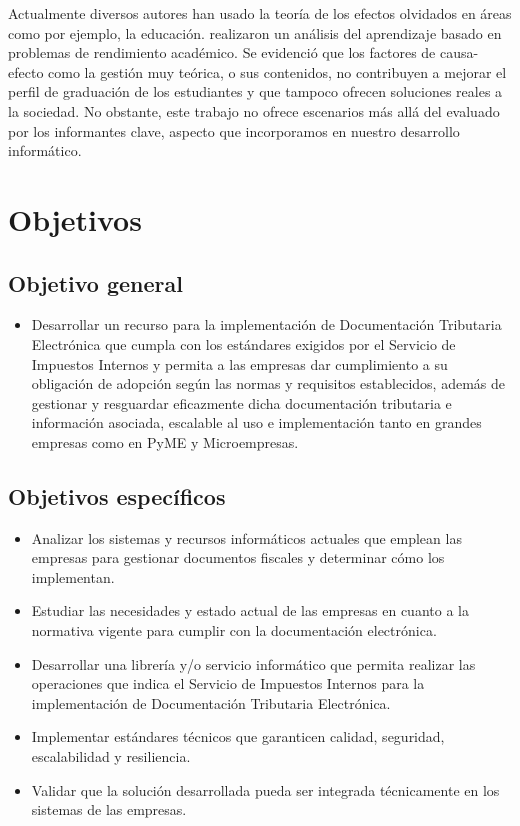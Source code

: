 Actualmente diversos autores han usado la teoría de los efectos olvidados en áreas como por ejemplo, la educación. \textcite{cabrera2020analysis} realizaron un análisis del aprendizaje basado en problemas de rendimiento académico. Se evidenció que los factores de causa-efecto como la gestión muy teórica, o sus contenidos, no contribuyen a mejorar el perfil de graduación de los estudiantes y que tampoco ofrecen soluciones reales a la sociedad. No obstante, este trabajo no ofrece escenarios más allá del evaluado por los informantes clave, aspecto que incorporamos en nuestro desarrollo informático.  \\

\section{Objetivos}
\subsection{Objetivo general}
\begin{itemize} 
    \item Desarrollar un recurso para la implementación de Documentación Tributaria Electrónica que cumpla con los estándares exigidos por el Servicio de Impuestos Internos y permita a las empresas dar cumplimiento a su obligación de adopción según las normas y requisitos establecidos, además de gestionar y resguardar eficazmente dicha documentación tributaria e información asociada, escalable al uso e implementación tanto en grandes empresas como en PyME y Microempresas.
\end{itemize}
\subsection{Objetivos específicos}
\begin{itemize}
	\item Analizar los sistemas y recursos informáticos actuales que emplean las empresas para gestionar documentos fiscales y determinar cómo los implementan.
	\item Estudiar las necesidades y estado actual de las empresas en cuanto a la normativa vigente para cumplir con la documentación electrónica.
	\item Desarrollar una librería y/o servicio informático que permita realizar las operaciones que indica el Servicio de Impuestos Internos para la implementación de Documentación Tributaria Electrónica.
	\item Implementar estándares técnicos que garanticen calidad, seguridad, escalabilidad y resiliencia.
	\item Validar que la solución desarrollada pueda ser integrada técnicamente en los sistemas de las empresas.
\end{itemize}